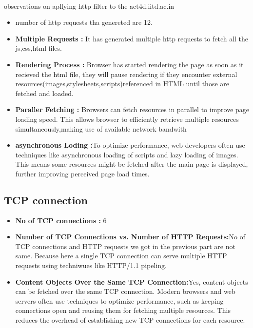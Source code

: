 \documentclass{article}
\begin{document}
\paragraph{} observations on apllying http filter to the act4d.iitd.ac.in
\begin{itemize}
    \item number of http requests tha genereted are 12.
    \item \textbf{Multiple Requests :} It has generated multiple http requests to fetch all the js,css,html files.
    \item\textbf{Rendering Process :} Browser has started rendering the page as soon as it recieved the html file, they will pause rendering if they encounter external resources(images,stylesheets,scripts)referenced in HTML until those are fetched and loaded.
    \item\textbf{Paraller Fetching :} Browsers can fetch resources in parallel to improve page loading speed. This allows browser to efficiently retrieve multiple resources simultaneously,making use of available network bandwith
    \item\textbf{asynchronous Loding :}To optimize performance, web developers often use techniques like asynchronous loading of scripts and lazy loading of images. This means some resources might be fetched after the main page is displayed, further improving perceived page load times.
    
\end{itemize}
\subsection{TCP connection}
\begin{itemize}
    \item \textbf{No of TCP connections :} 6
    \item \textbf{Number of TCP Connections vs. Number of HTTP Requests:}No of TCP connections and HTTP requests we got in the previous part are not same. Because here a single TCP connection can serve multiple HTTP requests using techniwues like HTTP/1.1 pipeling.
    \item \textbf{Content Objects Over the Same TCP Connection:}Yes, content objects can be fetched over the same TCP connection. Modern browsers and web servers often use techniques to optimize performance, such as keeping connections open and reusing them for fetching multiple resources. This reduces the overhead of establishing new TCP connections for each resource.
\end{itemize}
\end{document}
